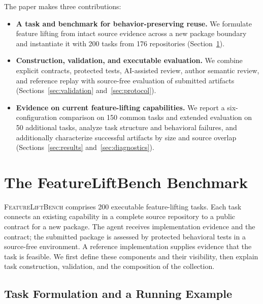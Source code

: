 \documentclass[acmsmall,screen,review,anonymous,nonacm]{acmart}
\newcommand{\flb}{\textsc{FeatureLiftBench}\xspace}
\begin{document}
The paper makes three contributions:
\begin{itemize}
 \item \textbf{A task and benchmark for behavior-preserving reuse.} We
 formulate feature lifting from intact source evidence across a new package
 boundary and instantiate it with 200 tasks from 176 repositories
 (Section~\ref{sec:benchmark}).
 \item \textbf{Construction, validation, and executable evaluation.} We
 combine explicit contracts, protected tests, AI-assisted review, author
 semantic review, and reference replay with source-free evaluation of submitted
 artifacts (Sections~\ref{sec:validation} and~\ref{sec:protocol}).
 \item \textbf{Evidence on current feature-lifting capabilities.} We report
 a six-configuration comparison on 150 common tasks and extended evaluation
 on 50 additional tasks, analyze task structure and behavioral failures, and
 additionally characterize successful artifacts by size and source overlap
 (Sections~\ref{sec:results} and~\ref{sec:diagnostics}).
\end{itemize}

\section{The FeatureLiftBench Benchmark}
\label{sec:benchmark}

\flb comprises 200 executable feature-lifting tasks. Each task connects an
existing capability in a complete source repository to a public contract for
a new package. The agent receives implementation evidence and the contract;
the submitted package is assessed by protected behavioral tests in a source-free
environment. A reference implementation supplies evidence that the task is
feasible. We first define these components and their visibility, then explain
task construction, validation, and the composition of the collection.

\subsection{Task Formulation and a Running Example}
\end{document}
